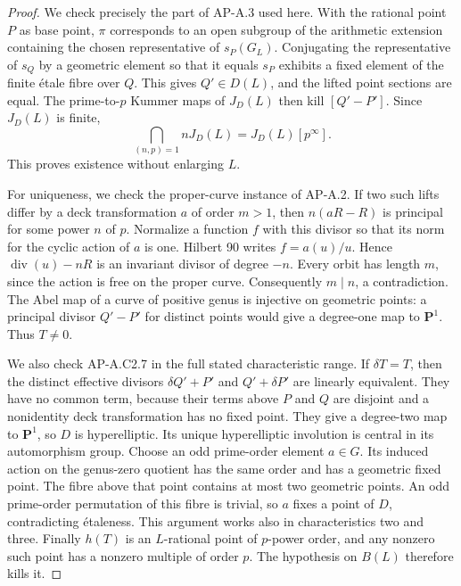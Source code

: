\documentclass[11pt]{article}
\begin{document}
\begin{proof}
We check precisely the part of AP-A.3 used here.  With the rational point
$P$ as base point, $\pi$ corresponds to an open subgroup of the arithmetic
extension containing the chosen representative of $s_P(G_L)$.  Conjugating
the representative of $s_Q$ by a geometric element so that it equals $s_P$
exhibits a fixed element of the finite \'etale fibre over $Q$.  This gives
$Q'\in D(L)$, and the lifted point sections are equal.  The prime-to-$p$
Kummer maps of $J_D(L)$ then kill $[Q'-P']$.  Since $J_D(L)$ is finite,
\[
            \bigcap_{(n,p)=1} nJ_D(L)=J_D(L)[p^\infty].
\]
This proves existence without enlarging $L$.

For uniqueness, we check the proper-curve instance of AP-A.2.  If two such
lifts differ by a deck transformation $a$ of order $m>1$, then
$n(aR-R)$ is principal for some power $n$ of $p$.  Normalize a function
$f$ with this divisor so that its norm for the cyclic action of $a$ is
one.  Hilbert 90 writes $f=a(u)/u$.  Hence
$\operatorname{div}(u)-nR$ is an invariant divisor of degree $-n$.
Every orbit has length $m$, since the action is free on the proper curve.
Consequently $m\mid n$, a contradiction.  The Abel map of a curve of
positive genus is injective on geometric points: a principal divisor
$Q'-P'$ for distinct points would give a degree-one map to $\mathbf P^1$.
Thus $T\ne0$.

We also check AP-A.C2.7 in the full stated characteristic range.  If
$\delta T=T$, then the distinct effective divisors
$\delta Q'+P'$ and $Q'+\delta P'$ are linearly equivalent.  They have no
common term, because their terms above $P$ and $Q$ are disjoint and a
nonidentity deck transformation has no fixed point.  They give a degree-two
map to $\mathbf P^1$, so $D$ is hyperelliptic.  Its unique hyperelliptic
involution is central in its automorphism group.  Choose an odd prime-order
element $a\in G$.  Its induced action on the genus-zero quotient has the
same order and has a geometric fixed point.  The fibre above that point
contains at most two geometric points.  An odd prime-order permutation of
this fibre is trivial, so $a$ fixes a point of $D$, contradicting \'etaleness.
This argument works also in characteristics two and three.  Finally $h(T)$
is an $L$-rational point of $p$-power order, and any nonzero such point has a
nonzero multiple of order $p$.  The hypothesis on $B(L)$ therefore kills it.
\end{proof}
\end{document}
